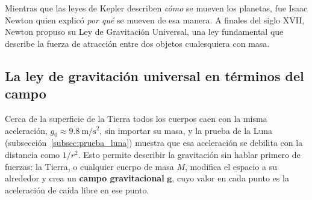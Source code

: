 \documentclass[11pt,a4paper]{book}
\begin{document}
Mientras que las leyes de Kepler describen \textit{cómo} se mueven los planetas, fue Isaac Newton quien explicó \textit{por qué} se mueven de esa manera. A finales del siglo XVII, Newton propuso su Ley de Gravitación Universal, una ley fundamental que describe la fuerza de atracción entre dos objetos cualesquiera con masa.



\subsection{La ley de gravitación universal en términos del campo}
\label{subsec:gravitacion_campo}

Cerca de la superficie de la Tierra todos los cuerpos caen con la misma
aceleración, $g_0 \approx \SI{9.8}{\meter\per\second\squared}$, sin importar
su masa, y la prueba de la Luna (subsección~\ref{subsec:prueba_luna}) muestra
que esa aceleración se debilita con la distancia como $1/r^{2}$. Esto permite describir la gravitación sin hablar primero de fuerzas:
la Tierra, o cualquier cuerpo de masa $M$, modifica el espacio a su alrededor
y crea un \textbf{campo gravitacional} $\boldsymbol{g}$, cuyo valor en cada
punto es la aceleración de caída libre en ese punto.
\end{document}
